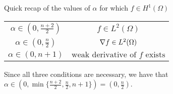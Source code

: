 Quick recap of the values of \(\alpha\) for which \(f \in H^1(\Omega)\) %
\begin{table}[h]
    \centering
        \begin{tabular}{c|c}
            \(\alpha \in (0, \frac{n + 2}{2})\) & \(f \in L^2(\Omega)\) \\
            \(\alpha \in (0, \frac{n}{2})\) & \(\nabla f \in L^2(\Omega)\) \\
            \(\alpha \in (0, n + 1)\) & \(\text{weak derivative of } f \text{ exists}\)
        \end{tabular}
\end{table}

Since all three conditions are necessary, we have that \(\alpha \in (0, \min\{\frac{n + 2}{2}, \frac{n}{2}, n + 1\}) = (0, \frac{n}{2})\).

